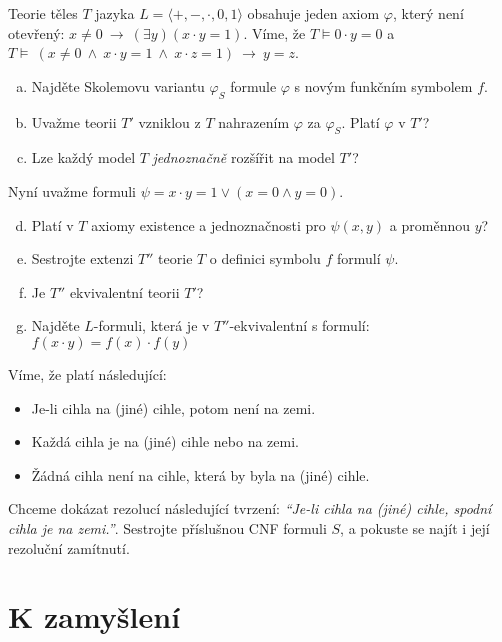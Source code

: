 \begin{problem}

    Teorie těles $T$ jazyka $L=\langle +,-,\cdot,0,1\rangle$ obsahuje jeden axiom $\varphi$, který není otevřený: $x\neq 0\ \to\ (\exists y)(x\cdot y=1)$. Víme, že $T\models 0\cdot y=0$ a $T\models\ (x\ne 0\ \wedge\ x\cdot y=1\ \wedge\ x\cdot z=1)\ \to\ y=z$.
    \begin{enumerate}[(a)]
        \item Najděte Skolemovu variantu $\varphi_S$ formule $\varphi$ s novým funkčním symbolem $f$.
        \item Uvažme teorii $T'$ vzniklou z $T$ nahrazením $\varphi$ za $\varphi_S$. Platí $\varphi$ v $T'$?
        \item Lze každý model $T$ \emph{jednoznačně} rozšířit na model $T'$?
    \end{enumerate}
    Nyní uvažme formuli $\psi=x\cdot y=1\vee  (x=0 \wedge y=0)$.
    \begin{enumerate}[(a)]
        \setcounter{enumi}{3}
        \item Platí v $T$ axiomy existence a jednoznačnosti pro $\psi(x,y)$ a proměnnou $y$?
        \item Sestrojte extenzi $T''$ teorie $T$ o definici symbolu $f$ formulí $\psi$.
        \item Je $T''$ ekvivalentní teorii $T'$?
        \item Najděte $L$-formuli, která je v $T''$-ekvivalentní s formulí:
        $f(x\cdot y)=f(x)\cdot f(y)$
    \end{enumerate}

\end{problem}


\medskip\begin{problem} Víme, že platí následující:
    \begin{itemize}\it
        \item Je-li cihla na (jiné) cihle, potom není na zemi.
        \item Každá cihla je na (jiné) cihle nebo na zemi.
        \item Žádná cihla není na cihle, která by byla na (jiné) cihle.
    \end{itemize}
    Chceme dokázat rezolucí následující tvrzení: {\it ``Je-li cihla na (jiné) cihle, spodní cihla je na zemi.''}. Sestrojte příslušnou CNF formuli $S$, a pokuste se najít i její rezoluční zamítnutí.
\end{problem}

        
\section*{K zamyšlení}

